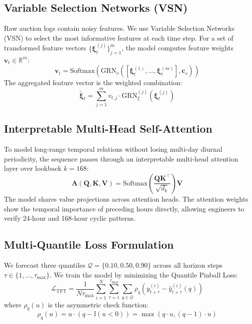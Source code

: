 \documentclass[sigconf]{acmart}
\begin{document}
\subsection{Variable Selection Networks (VSN)}
Raw auction logs contain noisy features. We use Variable Selection Networks (VSN) to select the most informative features at each time step. For a set of transformed feature vectors $\{\boldsymbol{\xi}_t^{(j)}\}_{j=1}^{m}$, the model computes feature weights $\mathbf{v}_t \in \mathbb{R}^m$:
\begin{equation}
  \mathbf{v}_t = \mathrm{Softmax}\left(\mathrm{GRN}_{v}\left([\boldsymbol{\xi}_t^{(1)}, \dots, \boldsymbol{\xi}_t^{(m)}], \mathbf{c}_s\right)\right)
\end{equation}
The aggregated feature vector is the weighted combination:
\begin{equation}
  \tilde{\boldsymbol{\xi}}_t = \sum_{j=1}^{m} v_{t, j} \cdot \mathrm{GRN}_{\xi}^{(j)}\left(\boldsymbol{\xi}_t^{(j)}\right)
\end{equation}

\subsection{Interpretable Multi-Head Self-Attention}
To model long-range temporal relations without losing multi-day diurnal periodicity, the sequence passes through an interpretable multi-head attention layer over lookback $k=168$:
\begin{equation}
  \mathbf{A}(\mathbf{Q}, \mathbf{K}, \mathbf{V}) = \mathrm{Softmax}\left(\frac{\mathbf{Q} \mathbf{K}^\top}{\sqrt{d_k}}\right)\mathbf{V}
\end{equation}
The model shares value projections across attention heads. The attention weights show the temporal importance of preceding hours directly, allowing engineers to verify 24-hour and 168-hour cyclic patterns.

\subsection{Multi-Quantile Loss Formulation}
We forecast three quantiles $\mathcal{Q} = \{0.10, 0.50, 0.90\}$ across all horizon steps $\tau \in \{1, \dots, \tau_{\max}\}$. We train the model by minimizing the Quantile Pinball Loss:
\begin{equation}
  \mathcal{L}_{\mathrm{TFT}} = \frac{1}{N \tau_{\max}} \sum_{i=1}^N \sum_{\tau=1}^{\tau_{\max}} \sum_{q \in \mathcal{Q}} \rho_q\left(y_{t+\tau}^{(i)} - \hat{y}_{t+\tau}^{(i)}(q)\right)
\end{equation}
where $\rho_q(u)$ is the asymmetric check function:
\begin{equation}
  \rho_q(u) = u \cdot \left(q - \mathbb{I}(u < 0)\right) = \max(q \cdot u, (q - 1) \cdot u)
\end{equation}
\end{document}
